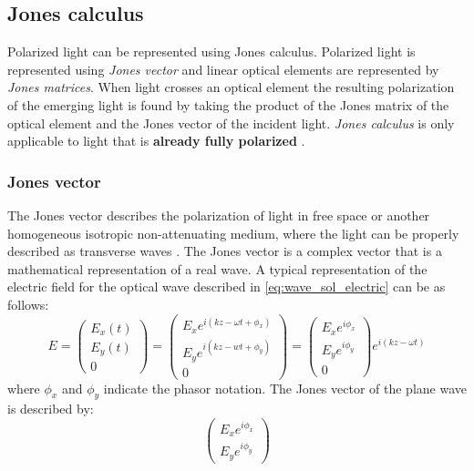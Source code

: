 \documentclass[../report.tex]{subfiles}
\begin{document}
		\subsection{Jones calculus}
Polarized light can be represented using Jones calculus. Polarized light is represented using \textit{Jones vector} and linear optical elements are represented by \textit{Jones matrices}.	When light crosses an optical element the resulting polarization of the emerging light is found by taking the product of the Jones matrix of the optical element and the Jones vector of the incident light. \textit{Jones calculus} is only applicable to light that is \textbf{already fully polarized} \cite{burch_introduction_1975}.
		
			\subsubsection{Jones vector}
The Jones vector describes the polarization of light in free space or another homogeneous isotropic non-attenuating medium, where the light can be properly described as transverse waves \cite{burch_introduction_1975}. The Jones vector is a complex vector that is a mathematical representation of a real wave. A typical representation of the electric field for the optical wave described in \ref{eq:wave_sol_electric} can be as follows:
\begin{equation}\label{eq:jones_vector}
E = \left( \begin{matrix} E_{x}\left( t\right) \\ E_{y}\left( t\right) \\ 0\end{matrix} \right) = \left( \begin{matrix} E_{x}e^{i\left( kz-\omega t+\phi _{x}\right)} \\ E_{y}e^{i\left( kz-wt+\phi _{y}\right) }\\ 0\end{matrix} \right) = \left( \begin{matrix} E_{x}e^{i\phi_x}\\ E_{y}e^{i\phi_y}\\ 0 \end{matrix} \right)e^{i\left( kz-\omega t\right)} 
\end{equation}
where $\phi_x$ and $\phi_y$ indicate the phasor notation. The Jones vector of the plane wave is described by:
\begin{equation}\label{eq:jones_vector_form}
\left( \begin{matrix} E_{x}e^{i\phi_x}\\ E_{y}e^{i\phi_y}\end{matrix} \right) 
\end{equation}
\end{document}

